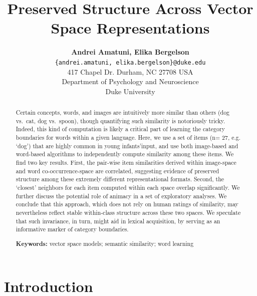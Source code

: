 \documentclass[10pt, letterpaper]{article}
\title{Preserved Structure Across Vector Space Representations}
\author{{\large \bf Andrei Amatuni, Elika Bergelson} \\ \texttt{\{andrei.amatuni, elika.bergelson\}@duke.edu} \\ 417 Chapel Dr. Durham, NC 27708 USA \\ Department of Psychology and Neuroscience \\ Duke University}
\begin{document}
\maketitle

\begin{abstract}
Certain concepts, words, and images are intuitively more similar than
others (dog vs.~cat, dog vs.~spoon), though quantifying such similarity
is notoriously tricky. Indeed, this kind of computation is likely a
critical part of learning the category boundaries for words within a
given language. Here, we use a set of items (n= 27, e.g. `dog') that are
highly common in young infants'input, and use both image-based and
word-based algorithms to independently compute similarity among these
items. We find two key results. First, the pair-wise item similarities
derived within image-space and word co-occurrence-space are correlated,
suggesting evidence of preserved structure among these extremely
different representational formats. Second, the `closest' neighbors for
each item computed within each space overlap significantly. We further
discuss the potential role of animacy in a set of exploratory analyses.
We conclude that this approach, which does not rely on human ratings of
similarity, may nevertheless reflect stable within-class structure
across these two spaces. We speculate that such invariance, in turn,
might aid in lexical acquisition, by serving as an informative marker of
category boundaries.

\textbf{Keywords:}
vector space models; semantic similarity; word learning
\end{abstract}

\section{Introduction}\label{introduction}
\end{document}
